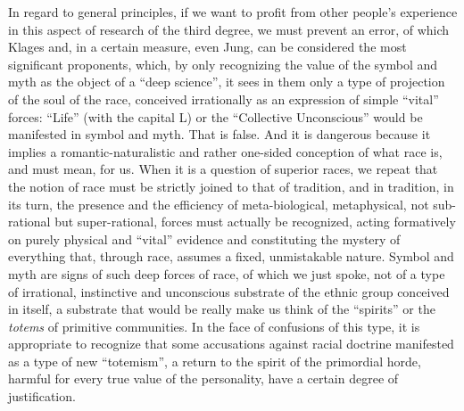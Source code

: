 In regard to general principles, if we want to profit from other people's experience in this aspect of research of the third degree, we must prevent an error, of which Klages and, in a certain measure, even Jung, can be considered the most significant proponents, which, by only recognizing the value of the symbol and myth as the object of a ``deep science'', it sees in them only a type of projection of the soul of the race, conceived irrationally as an expression of simple ``vital'' forces: ``Life'' (with the capital L) or the ``Collective Unconscious'' would be manifested in symbol and myth. That is false. And it is dangerous because it implies a romantic-naturalistic and rather one-sided conception of what race is, and must mean, for us. When it is a question of superior races, we repeat that the notion of race must be strictly joined to that of tradition, and in tradition, in its turn, the presence and the efficiency of meta-biological, metaphysical, not sub-rational but super-rational, forces must actually be recognized, acting formatively on purely physical and ``vital'' evidence and constituting the mystery of everything that, through race, assumes a fixed, unmistakable nature. Symbol and myth are signs of such deep forces of race, of which we just spoke, not of a type of irrational, instinctive and unconscious substrate of the ethnic group conceived in itself, a substrate that would be really make us think of the ``spirits'' or the \emph{totems} of primitive communities. In the face of confusions of this type, it is appropriate to recognize that some accusations against racial doctrine manifested as a type of new ``totemism'', a return to the spirit of the primordial horde, harmful for every true value of the personality, have a certain degree of justification.

